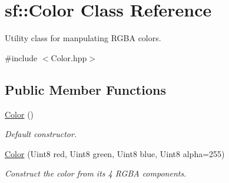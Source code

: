 \hypertarget{classsf_1_1_color}{\section{sf\+:\+:Color Class Reference}
\label{classsf_1_1_color}
}


Utility class for manpulating R\+G\+B\+A colors.  




{\ttfamily \#include $<$Color.\+hpp$>$}

\subsection*{Public Member Functions}
\begin{DoxyCompactItemize}
\item 
\hyperlink{classsf_1_1_color_ac2eb4393fb11ad3fa3ccf34e92fe08e4}{Color} ()
\begin{DoxyCompactList}\small\item\em Default constructor. \end{DoxyCompactList}\item 
\hyperlink{classsf_1_1_color_ac791dc61be4c60baac50fe700f1c9850}{Color} (Uint8 red, Uint8 green, Uint8 blue, Uint8 alpha=255)
\begin{DoxyCompactList}\small\item\em Construct the color from its 4 R\+G\+B\+A components. \end{DoxyCompactList}\end{DoxyCompactItemize}
